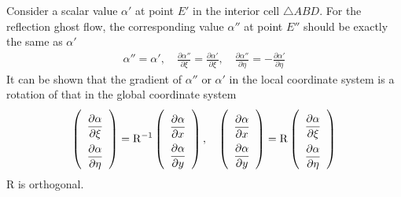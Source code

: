 \documentclass[a4paper,12pt,dvips]{article}
\begin{document}
Consider a scalar value $\alpha'$ at point $E'$ in the interior cell
$\bigtriangleup ABD$.  For the reflection ghost flow, the corresponding value
$\alpha''$ at point $E''$ should be exactly the same as $\alpha'$
\begin{align}
\alpha'' = \alpha', \quad
\frac{\partial\alpha''}{\partial\xi} = \frac{\partial\alpha'}{\partial\xi},
\quad
\frac{\partial\alpha''}{\partial\eta} = -\frac{\partial\alpha'}{\partial\eta}
\label{e:reflection_sca}
\end{align}
It can be shown that the gradient of $\alpha''$ or $\alpha'$ in the local
coordinate system is a rotation of that in the global coordinate system
\begin{align}
\renewcommand{\arraystretch}{2.2}
\left(\begin{array}{c}
  \dfrac{\partial\alpha}{\partial\xi} \\ 
  \dfrac{\partial\alpha}{\partial\eta}
\end{array}\right) = \mathrm{R}^{-1}
\left(\begin{array}{c}
  \dfrac{\partial\alpha}{\partial x} \\ 
  \dfrac{\partial\alpha}{\partial y}
\end{array}\right), \quad
\renewcommand{\arraystretch}{2.2}
\left(\begin{array}{c}
  \dfrac{\partial\alpha}{\partial x} \\ 
  \dfrac{\partial\alpha}{\partial y}
\end{array}\right) = \mathrm{R}
\left(\begin{array}{c}
  \dfrac{\partial\alpha}{\partial\xi} \\ 
  \dfrac{\partial\alpha}{\partial\eta}
\end{array}\right) \label{e:reflection_sca_trans}
\end{align}
$\mathrm{R}$ is orthogonal.
\end{document}
